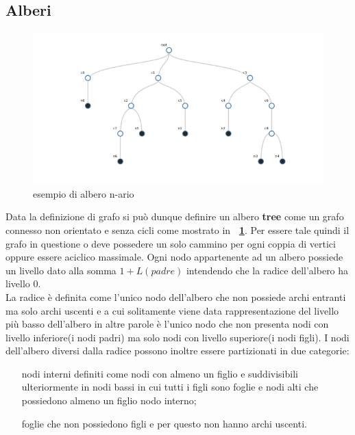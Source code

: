 \subsection{Alberi}
\begin{figure}[!htb]
	\begin{center}
		\includegraphics[width=0.8 \linewidth]{figure/alberoGenerico}
	\end{center}
	\caption{esempio di albero n-ario \label{fig:alberoGenerico}}
\end{figure}
Data la definizione di grafo si può dunque definire un albero \textbf{tree} come un grafo connesso non orientato e senza cicli come mostrato in \textbf{\figurename~\ref{fig:alberoGenerico}}. Per essere tale quindi il grafo in questione o deve possedere un solo cammino per ogni coppia di vertici oppure essere aciclico massimale.
Ogni nodo appartenente ad un albero possiede un livello dato alla somma $ 1 + L(padre) $ intendendo che la radice dell'albero ha livello 0.\\
La radice è definita come l'unico nodo dell'albero che non possiede archi entranti ma solo archi uscenti e a cui solitamente viene data rappresentazione del livello più basso dell'albero in altre parole è l'unico nodo che non presenta nodi con livello inferiore(i nodi padri) ma solo nodi con livello superiore(i nodi figli). 
I nodi dell'albero diversi dalla radice possono inoltre essere partizionati in due categorie:\\
\begin{itemize}
	\item[nodi interni] definiti come nodi con almeno un figlio e suddivisibili ulteriormente in nodi bassi in cui tutti i figli sono foglie e nodi alti che possiedono almeno un figlio nodo interno;
	\item[foglie] che non possiedono figli e per questo non hanno archi uscenti.
\end{itemize}

